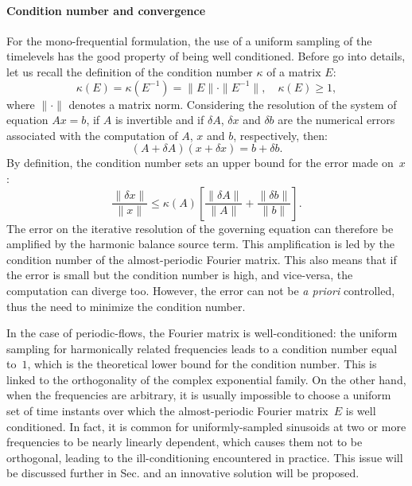 \paragraph{Condition number and convergence}
For the mono-frequential formulation, the use of a uniform
sampling of the timelevels has the good property of being
well conditioned.
Before go into details, let us recall the definition of the
condition number $\kappa$ of a matrix $E$:
\begin{equation}
	\kappa (E) = \kappa (E^{-1}) = \| E \| \cdot \| E^{-1} \|, \quad
    \kappa(E) \geq 1,
\end{equation}
where $\| \cdot \|$ denotes a matrix norm.  Considering the resolution
of the system of equation
$A x = b$, if $A$ is invertible and if $\delta A$, $\delta x$ and
$\delta b$ are the numerical errors associated with the computation of
$A$, $x$ and $b$, respectively, then:
\begin{equation}
   (A + \delta A)(x + \delta x) = b + \delta b.
   \label{eq:error_reso}
\end{equation}
By definition, the condition number sets an upper bound for 
the error made on~$x$:
\begin{equation}
   \frac{\| \delta x \|}{\| x \|} \leq 
   \kappa(A)\left[\frac{\| \delta A \|}{\| A \|} + 
   \frac{\| \delta b \|}{\| b \|} \right].
   \label{eq:conditonnig_amp}
\end{equation}
The error on the iterative resolution of the governing equation can
therefore be amplified by the harmonic balance source term. 
This amplification is
led by the condition number of the almost-periodic Fourier matrix. This
also means that if the error is small but the condition number is
high, and vice-versa, the computation can diverge too. However, the
error can not be \emph{a priori} controlled, thus the need to
minimize the condition number.

In the case of periodic-flows, the Fourier matrix is well-conditioned: the
uniform sampling for harmonically related frequencies leads to a
condition number equal to~$1$, which is the theoretical lower bound
for the condition number.  This is linked to the orthogonality of the
complex exponential family.  On the other hand, when the frequencies are arbitrary, it is usually
impossible to choose a uniform set of time instants over which the
almost-periodic Fourier matrix~$E$ is well conditioned. In fact, it is common for uniformly-sampled
sinusoids at two or more frequencies to be nearly linearly dependent,
which causes them not to be orthogonal, leading to the
ill-conditioning encountered in practice. This issue will be discussed
further in Sec. and an innovative
solution will be proposed.

